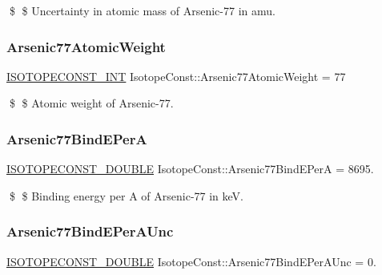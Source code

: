 \$ \$ Uncertainty in atomic mass of Arsenic-\/77 in amu. \mbox{\label{group___isotope_const-_arsenic-_as77_gab0c4dd4fea96f358138c9a8206ca862a}} 
\subsubsection{\texorpdfstring{Arsenic77\+Atomic\+Weight}{Arsenic77AtomicWeight}}
{\footnotesize\ttfamily \mbox{\hyperlink{group___isotope_const-_macros_ga5f18360b3e99483a35c32d789e62621c}{I\+S\+O\+T\+O\+P\+E\+C\+O\+N\+S\+T\+\_\+\+I\+NT}} Isotope\+Const\+::\+Arsenic77\+Atomic\+Weight = 77}

\$ \$ Atomic weight of Arsenic-\/77. \mbox{\label{group___isotope_const-_arsenic-_as77_ga5443de8d4609579cc19cd36e1ead80dd}} 
\subsubsection{\texorpdfstring{Arsenic77\+Bind\+E\+PerA}{Arsenic77BindEPerA}}
{\footnotesize\ttfamily \mbox{\hyperlink{group___isotope_const-_macros_ga8f45a7272ce02c0b4c65c44636ed719a}{I\+S\+O\+T\+O\+P\+E\+C\+O\+N\+S\+T\+\_\+\+D\+O\+U\+B\+LE}} Isotope\+Const\+::\+Arsenic77\+Bind\+E\+PerA = 8695.}

\$ \$ Binding energy per A of Arsenic-\/77 in keV. \mbox{\label{group___isotope_const-_arsenic-_as77_gacd1c57db16c3f563c5335953fda0072c}} 
\subsubsection{\texorpdfstring{Arsenic77\+Bind\+E\+Per\+A\+Unc}{Arsenic77BindEPerAUnc}}
{\footnotesize\ttfamily \mbox{\hyperlink{group___isotope_const-_macros_ga8f45a7272ce02c0b4c65c44636ed719a}{I\+S\+O\+T\+O\+P\+E\+C\+O\+N\+S\+T\+\_\+\+D\+O\+U\+B\+LE}} Isotope\+Const\+::\+Arsenic77\+Bind\+E\+Per\+A\+Unc = 0.}

